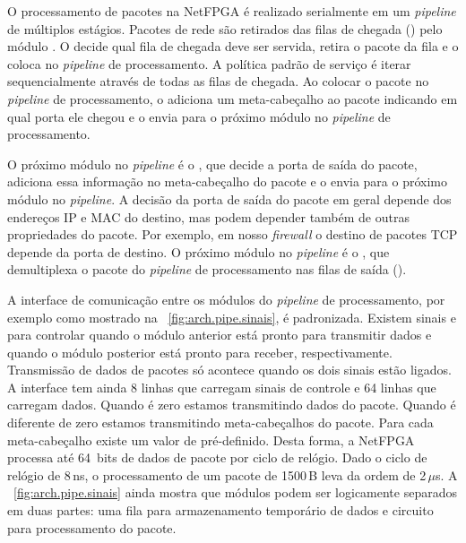 O processamento de pacotes na NetFPGA é realizado serialmente em um
\emph{pipeline} de múltiplos estágios.  Pacotes de rede são retirados
das filas de chegada () pelo módulo .
O  decide qual fila de chegada deve ser servida,
retira o pacote da fila e o coloca no \emph{pipeline} de processamento.
A política padrão de serviço é iterar sequencialmente através de todas
as filas de chegada.  Ao colocar o pacote no \emph{pipeline} de
processamento, o  adiciona um meta-cabeçalho ao
pacote indicando em qual porta ele chegou e o envia para o próximo
módulo no \emph{pipeline} de processamento.

O próximo módulo no \emph{pipeline} é o , que
decide a porta de saída do pacote, adiciona essa informação no
meta-cabeçalho do pacote e o envia para o próximo módulo no
\emph{pipeline}.  A decisão da porta de saída do pacote em geral depende
dos endereços IP e MAC do destino, mas podem depender também de outras
propriedades do pacote.  Por exemplo, em nosso \emph{firewall} o destino
de pacotes TCP depende da porta de destino.  O próximo módulo no
\emph{pipeline} é o , que demultiplexa o pacote do
\emph{pipeline} de processamento nas filas de saída ().

A interface de comunicação entre os módulos do \emph{pipeline} de
processamento, por exemplo como mostrado na
\figstr~\ref{fig:arch.pipe.sinais}, é padronizada.  Existem sinais
 e  para controlar quando o módulo anterior está pronto
para transmitir dados e quando o módulo posterior está pronto para
receber, respectivamente.  Transmissão de dados de pacotes só acontece
quando os dois sinais estão ligados.  A interface tem ainda 8 linhas
 que carregam sinais de controle e 64 linhas  que
carregam dados.  Quando  é zero estamos transmitindo dados do
pacote. Quando  é diferente de zero estamos transmitindo
meta-cabeçalhos do pacote.  Para cada meta-cabeçalho existe um valor de
 pré-definido.\footnotemark{}   Desta forma, a NetFPGA
processa até 64~bits de dados de pacote por ciclo de relógio.  Dado o
ciclo de relógio de 8\,ns, o processamento de um pacote de 1500\,B leva
da ordem de 2\,$\mu$s.  A \figstr~\ref{fig:arch.pipe.sinais} ainda
mostra que módulos podem ser logicamente separados em duas partes: uma
fila para armazenamento temporário de dados e circuito para
processamento do pacote.


